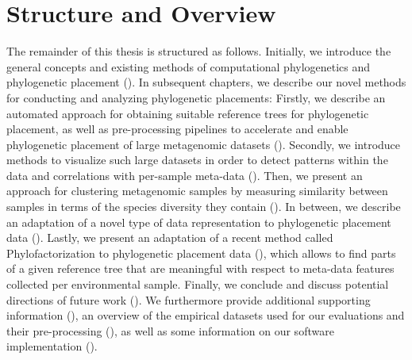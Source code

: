 \section{Structure and Overview}
\label{ch:Introduction:sec:StructureOverview}

The remainder of this thesis is structured as follows.
Initially, we introduce the general concepts and existing methods
of computational phylogenetics and phylogenetic placement ().
In subsequent chapters, we describe our novel methods for conducting and analyzing phylogenetic placements:
Firstly, we describe an automated approach for obtaining suitable reference trees for phylogenetic placement,
as well as pre-processing pipelines to accelerate and enable
phylogenetic placement of large metagenomic datasets ().
Secondly, we introduce methods to visualize such large datasets
in order to detect patterns within the data and correlations with per-sample meta-data ().
Then, we present an approach for clustering metagenomic samples
by measuring similarity between samples in terms of the species diversity they contain ().
In between, we describe an adaptation of a novel type of data representation
to phylogenetic placement data ().
Lastly, we present an adaptation of a recent method called Phylofactorization
to phylogenetic placement data (),
which allows to find parts of a given reference tree
that are meaningful with respect to meta-data features collected per environmental sample.
Finally, we conclude and discuss potential directions of future work ().
We furthermore provide additional supporting information (),
an overview of the empirical datasets used for our evaluations and their pre-processing (),
as well as some information on our software implementation ().


